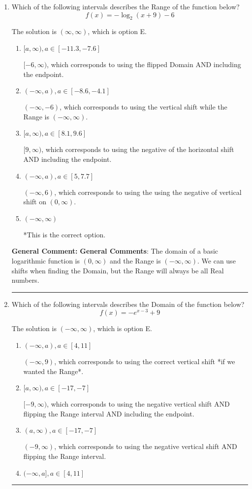 \documentclass{extbook}[14pt]
\newcommand{\litem}[1]{\item #1

\rule{\textwidth}{0.4pt}}
\begin{document}
\begin{enumerate}\litem{
Which of the following intervals describes the Range of the function below?
\[ f(x) = -\log_2{(x+9)}-6 \]

The solution is \( (\infty, \infty) \), which is option E.\begin{enumerate}[label=\Alph*.]
\item \( [a, \infty), a \in [-11.3, -7.6] \)

$[-6, \infty)$, which corresponds to using the flipped Domain AND including the endpoint.
\item \( (-\infty, a), a \in [-8.6, -4.1] \)

$(-\infty, -6)$, which corresponds to using the vertical shift while the Range is $(-\infty, \infty)$.
\item \( [a, \infty), a \in [8.1, 9.6] \)

$[9, \infty)$, which corresponds to using the negative of the horizontal shift AND including the endpoint.
\item \( (-\infty, a), a \in [5, 7.7] \)

$(-\infty, 6)$, which corresponds to using the using the negative of vertical shift on $(0, \infty)$.
\item \( (-\infty, \infty) \)

*This is the correct option.
\end{enumerate}

\textbf{General Comment:} \textbf{General Comments}: The domain of a basic logarithmic function is $(0, \infty)$ and the Range is $(-\infty, \infty)$. We can use shifts when finding the Domain, but the Range will always be all Real numbers.
}
\litem{
Which of the following intervals describes the Domain of the function below?
\[ f(x) = -e^{x-3}+9 \]

The solution is \( (-\infty, \infty) \), which is option E.\begin{enumerate}[label=\Alph*.]
\item \( (-\infty, a), a \in [4, 11] \)

$(-\infty, 9)$, which corresponds to using the correct vertical shift *if we wanted the Range*.
\item \( [a, \infty), a \in [-17, -7] \)

$[-9, \infty)$, which corresponds to using the negative vertical shift AND flipping the Range interval AND including the endpoint.
\item \( (a, \infty), a \in [-17, -7] \)

$(-9, \infty)$, which corresponds to using the negative vertical shift AND flipping the Range interval.
\item \( (-\infty, a], a \in [4, 11] \)


\end{enumerate}}
\end{enumerate}
\end{document}
